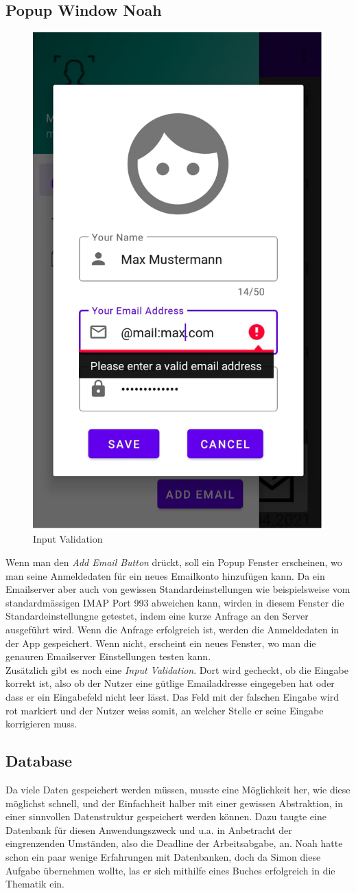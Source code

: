 \documentclass[a4paper,11pt]{article}
\begin{document}
\subsection{Popup Window Noah }
\begin{figure}
\centering
\includegraphics[width=.18\textwidth]{media/inputValidation.png}
\caption{Input Validation}
\end{figure}
Wenn man den \textit{Add Email Button} drückt, soll ein Popup Fenster erscheinen, wo man seine Anmeldedaten für ein neues Emailkonto hinzufügen kann. Da ein Emailserver aber auch von gewissen Standardeinstellungen wie beispielsweise vom standardmässigen IMAP Port 993 abweichen kann, wirden in diesem Fenster die Standardeinstellungne getestet, indem eine kurze Anfrage an den Server ausgeführt wird. Wenn die Anfrage erfolgreich ist, werden die Anmeldedaten in der App gespeichert. Wenn nicht, erscheint ein neues Fenster, wo man die genauren Emailserver Einstellungen testen kann.\\

Zusätzlich gibt es noch eine \textit{Input Validation}. Dort wird gecheckt, ob die Eingabe korrekt ist, also ob der Nutzer eine gütlige Emailaddresse eingegeben hat oder dass er ein Eingabefeld nicht leer lässt. Das Feld mit der falschen Eingabe wird rot markiert und der Nutzer weiss somit, an welcher Stelle er seine Eingabe korrigieren muss.

\subsection{Database}


Da viele Daten gespeichert werden müssen, musste eine Möglichkeit her, wie diese möglichst schnell, und der Einfachheit halber mit einer gewissen Abstraktion, in einer sinnvollen Datenstruktur gespeichert werden können. Dazu taugte eine Datenbank für diesen Anwendungszweck und u.a. in Anbetracht der eingrenzenden Umständen, also die Deadline der Arbeitsabgabe, an. Noah hatte schon ein paar wenige Erfahrungen mit Datenbanken, doch da Simon diese Aufgabe übernehmen wollte, las er sich mithilfe eines Buches \cite{riccardi2001} erfolgreich in die Thematik ein.
\end{document}
